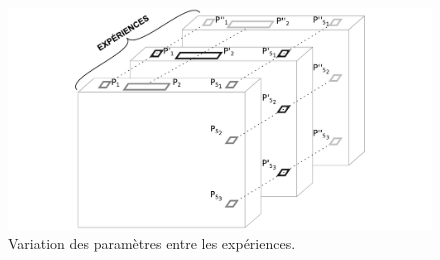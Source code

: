 \begin{figure}[H]
	\includegraphics[width=\linewidth]{img/schemas_params_4_experiences.pdf}
	\caption{Variation des paramètres entre les expériences.} 
	\label{fig:parametres-these-experiences} 
\end{figure}



%

%
%



